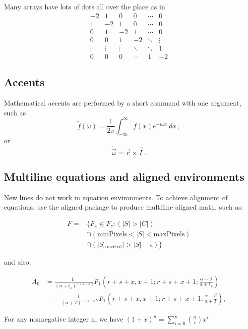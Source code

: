 Many arrays have lots of dots all over the place as in
\begin{equation}
        \begin{matrix}
                -2 & 1 & 0 & 0 & \cdots & 0  \\
                1 & -2 & 1 & 0 & \cdots & 0  \\
                0 & 1 & -2 & 1 & \cdots & 0  \\
                0 & 0 & 1 & -2 & \ddots & \vdots \\
                \vdots & \vdots & \vdots & \ddots & \ddots & 1  \\
                0 & 0 & 0 & \cdots & 1 & -2
        \end{matrix}
\end{equation}

\subsection{Accents}
Mathematical accents are performed by a short command with one
argument, such as
\begin{equation}
        \tilde f(\omega)=\frac{1}{2\pi}
        \int_{-\infty}^\infty f(x)e^{-i\omega x}\,dx\,,
\end{equation}
or
\begin{equation}
        \dot{\vec \omega}=\vec r\times\vec I\,.
\end{equation}

\subsection{Multiline equations and aligned environments}
New lines do not work in equation environments. To achieve alignment of equations, use the aligned  package to produce multiline aligned math, such as:

\begin{center}
\begin{align}
F ={} & \{F_{x} \in  F_{c} : (|S| > |C|) \\
      & \cap (\mathrm{minPixels}  < |S| < \mathrm{maxPixels}) \nonumber \\
      & \cap (|S_{\mathrm{conected}}| > |S| - \epsilon) \} \nonumber
\end{align}
\end{center}
and also:
\begin{center}
\begin{align}
A_0 & =   \frac{1}{(\alpha+t_x)^{r+s+x}}{}_2 F_1\left( r+s+x,x+1;r+s+x+1;\frac{\alpha-\beta}{\alpha + t_x} \right) \\
& \quad - \frac{1}{(\alpha+T)^{r+s+x}}{}_2 F_1\left( r+s+x,x+1;r+s+x+1;\frac{\alpha-\beta}{\alpha + T} \right),
\end{align}
\end{center}

\begin{theorem}
For any nonnegative integer n, we have
$(1+x)^n = \sum_{i=0}^n {n \choose i} x^i$
\end{theorem}


